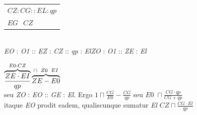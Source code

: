 \protect\begin{tabular}{l}$CZ:CG::EL:qp$\\$EG\hspace{9pt}CZ$\protect\end{tabular}\\\textit{EO} : \textit{O1} :: \textit{EZ} : \textit{CZ} :: \textit{qp} : \textit{El}\textit{ZO} : \textit{O1} :: \textit{ZE} : \textit{El} \\\rule[-4mm]{0mm}{10mm} $\protect\overbrace{\frac{ZE\cdot EI}{qp}}^{E0\cdot CZ}\protect\overbrace{ZE - E0}^{\sqcap\hspace{5pt} Z0\hspace{5pt}EI}$ \\seu \textit{ZO} : \textit{EO} :: \textit{GE} : \textit{El}. Ergo $\displaystyle 1\sqcap\frac{CG}{E0} - \frac{CG}{qp}$ seu $\displaystyle E0\; \sqcap \frac{CG\cdot qp}{CG+qp}$ \\itaque \textit{EO} prodit eadem, qualiscunque sumatur \textit{El} $\displaystyle CZ \sqcap \frac{CG \cdot El}{qp}$\rule[-4mm]{0mm}{10mm} 
\pend \addtocounter{footnote}{1}
          